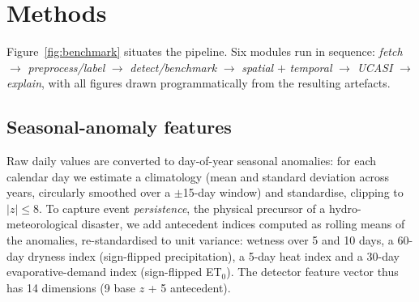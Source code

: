 \documentclass[preprint,12pt]{elsarticle}
\begin{document}
\section{Methods}\label{sec:methods}
Figure~\ref{fig:benchmark} situates the pipeline. Six modules run in sequence:
\emph{fetch} $\rightarrow$ \emph{preprocess/label} $\rightarrow$
\emph{detect/benchmark} $\rightarrow$ \emph{spatial} $+$ \emph{temporal}
$\rightarrow$ \emph{UCASI} $\rightarrow$ \emph{explain}, with all figures drawn
programmatically from the resulting artefacts.

\subsection{Seasonal-anomaly features}
Raw daily values are converted to day-of-year seasonal anomalies: for each
calendar day we estimate a climatology (mean and standard deviation across
years, circularly smoothed over a $\pm$15-day window) and standardise, clipping
to $|z|\leq 8$. To capture event \emph{persistence}, the physical precursor of a
hydro-meteorological disaster, we add antecedent indices computed as
rolling means of the anomalies, re-standardised to unit variance:
wetness over 5 and 10 days, a 60-day dryness index (sign-flipped precipitation),
a 5-day heat index and a 30-day evaporative-demand index (sign-flipped ET$_0$).
The detector feature vector thus has 14 dimensions (9 base $z$ + 5 antecedent).
\end{document}
